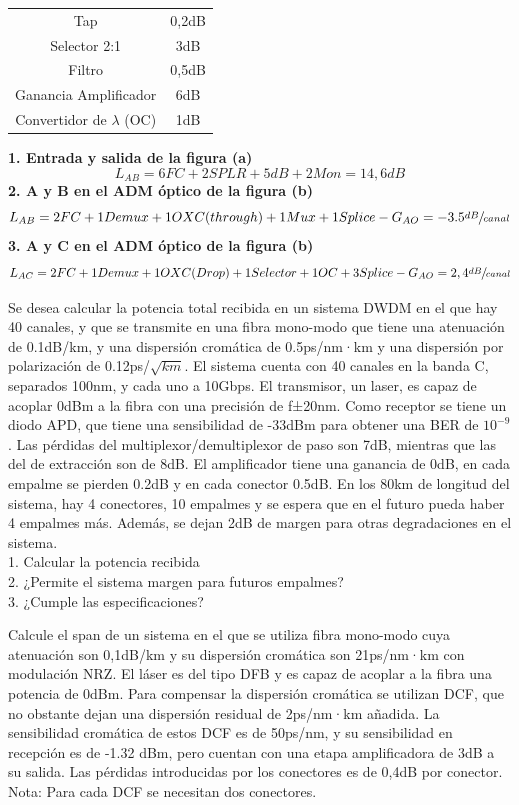 \begin{exercise}[8]
\begin{center}
\begin{tabular}{c | c}
	Tap						& 0,2dB\\
	Selector 2:1			& 3dB\\
	Filtro					& 0,5dB\\
	Ganancia Amplificador	& 6dB\\
	Convertidor de $\lambda$ (OC)	& 1dB\\\hline
\end{tabular}
\end{center}
\textbf{1. Entrada y salida de la figura (a)}\\
\[L_{AB}=6FC+2SPLR+5dB+2Mon=14,6dB\] 
\textbf{2. A y B en el ADM óptico de la figura (b)}\\
\[L_{AB}=2FC+1Demux+1OXC(through)+1Mux+1Splice-G_{AO}=-3.5\sfrac{dB}{canal}\]
\textbf{3. A y C en el ADM óptico de la figura (b)}\\
\[L_{AC}=2FC+1Demux+1OXC(Drop)+1Selector+1OC+3Splice-G_{AO}=2,4\sfrac{dB}{canal}\]
\end{exercise}
\begin{exercise}[9]
	Se desea calcular la potencia total recibida en un sistema DWDM en el que hay 40 canales, y que se transmite en una fibra mono-modo que tiene una atenuación de 0.1dB/km, y una dispersión cromática de 0.5ps/nm·km y una dispersión por polarización de 0.12ps/$\sqrt{km}$. El sistema cuenta con 40 canales en la banda C, separados 100nm, y cada uno a 10Gbps. El transmisor, un laser, es capaz de acoplar 0dBm a la fibra con una precisión de f±20nm. Como receptor se tiene un diodo APD, que tiene una sensibilidad de -33dBm para obtener una BER de $10^{-9}$ . Las pérdidas del multiplexor/demultiplexor de paso son 7dB, mientras que las del de extracción son de 8dB. El amplificador tiene una ganancia de 0dB, en cada empalme se pierden 0.2dB y en cada conector 0.5dB. En los 80km de longitud del sistema, hay 4 conectores, 10 empalmes y se espera que en el futuro pueda haber 4 empalmes más. Además, se dejan 2dB de margen para otras degradaciones en el sistema.\\
1. Calcular la potencia recibida\\
2. ¿Permite el sistema margen para futuros empalmes?\\
3. ¿Cumple las especificaciones?
\end{exercise}
\begin{exercise}[10]
	Calcule el span de un sistema en el que se utiliza fibra mono-modo cuya atenuación son 0,1dB/km y su dispersión cromática son 21ps/nm·km con modulación NRZ. El láser es del tipo DFB y es capaz de acoplar a la fibra una potencia de 0dBm. Para compensar la dispersión cromática se utilizan DCF, que no obstante dejan una dispersión residual de 2ps/nm·km añadida. La sensibilidad cromática de estos DCF es de 50ps/nm, y su sensibilidad en recepción es de -1.32 dBm, pero cuentan con una etapa amplificadora de 3dB a su salida. Las pérdidas introducidas por los conectores es de 0,4dB por conector.\\
Nota: Para cada DCF se necesitan dos conectores.
\end{exercise}